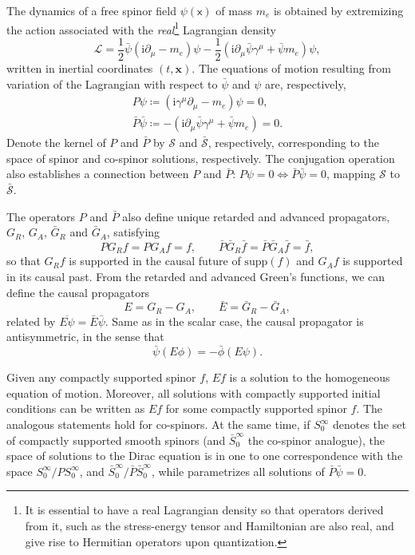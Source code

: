\documentclass[letterpaper,12pt,titlepage,oneside,final]{book}
\newcommand{\mf}{\mathsf}%
\newcommand{\ii}{\mathrm{i}}
\begin{document}
The dynamics of a free spinor field  $\psi(\mf x)$ of mass $m_e$ is obtained by extremizing the action associated with the \textit{real}\footnote{It is essential to have a real Lagrangian density so that operators derived from it, such as the stress-energy tensor and Hamiltonian are also real, and give rise to Hermitian operators upon quantization.} Lagrangian density
\begin{equation}
    \mathscr{L} = \frac{1}{2}\bar{\psi}(\ii\partial_\mu - m_e)\psi - \frac{1}{2} (\ii\partial_\mu\bar{\psi}\gamma^\mu + \bar{\psi}m_e)\psi,
\end{equation}
written in inertial coordinates $(t,\bm x)$. The equations of motion resulting from variation of the Lagrangian with respect to $\bar{\psi}$ and $\psi$ are, respectively,
\begin{align}
    P\psi \coloneqq (\ii\gamma^\mu\partial_\mu - m_e)\psi = 0,\\
    \bar{P}\bar{\psi} \coloneqq -(\ii\partial_\mu\bar{\psi}\gamma^\mu + \bar{\psi}m_e) = 0.
\end{align}
Denote the kernel of $P$ and $\bar{P}$ by $\mathcal{S}$ and $\bar{\mathcal{S}}$, respectively, corresponding to the space of spinor and co-spinor solutions, respectively. The conjugation operation also establishes a connection between $P$ and $\bar{P}$: $P \psi = 0 \Leftrightarrow \bar{P}\bar{\psi} = 0$, mapping $\mathcal{S}$ to $\bar{\mathcal{S}}$.

The operators $P$ and $\bar{P}$ also define unique retarded and advanced propagators, $G_R$, $G_A$, $\bar{G}_R$ and $\bar{G}_A$, satisfying
\begin{equation}
    PG_R f = P G_A f = f, \quad \quad \bar{P} \bar{G}_R \bar{f} = \bar{P} \bar{G}_A \bar{f} = \bar{f},
\end{equation}
so that ${G}_Rf$ is supported in the causal future of $\text{supp}(f)$ and ${G}_Af$ is supported in its causal past. From the retarded and advanced Green's functions, we can define the causal propagators
\begin{equation}
    E = G_R - G_A, \quad \quad \bar{E} = \bar{G}_R - \bar{G}_A,
\end{equation}
related by $\overline{E\psi} = \bar{E} \bar{\psi}$. Same as in the scalar case, the causal propagator is antisymmetric, in the sense that
\begin{equation}
    \bar{\psi}(E\phi) = - \bar{\phi}(E\psi).
\end{equation}

Given any compactly supported spinor $f$, $Ef$ is a solution to the homogeneous equation of motion. Moreover, all solutions with compactly supported initial conditions can be written as $Ef$ for some compactly supported spinor $f$. The analogous statements hold for co-spinors. At the same time, if $S_0^\infty$ denotes the set of compactly supported smooth spinors (and $\bar{S}_0^\infty$ the co-spinor analogue), the space of solutions to the Dirac equation is in one to one correspondence with the space $S_0^\infty/PS_0^\infty$, and $\bar{S}_0^\infty/\bar{P}\bar{S}_0^\infty$, while parametrizes all solutions of $\bar{P}\bar{\psi} = 0$.
\end{document}
